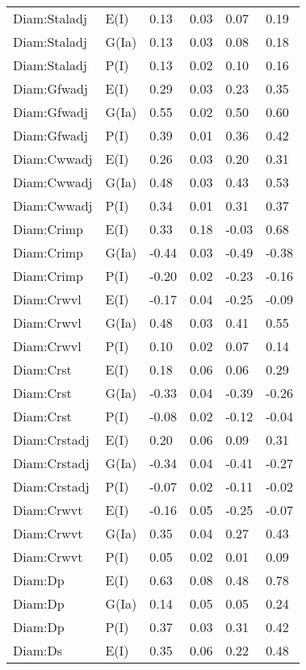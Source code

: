 \begin{center}
\begin{longtable}{|p{1.1in}|p{0.7in}|p{0.7in}|p{0.6in}|p{0.6in}|p{0.6in}|}
  Diam:Staladj & E(I) & 0.13 & 0.03 & 0.07 & 0.19 \\ 
  Diam:Staladj & G(Ia) & 0.13 & 0.03 & 0.08 & 0.18 \\ 
  Diam:Staladj & P(I) & 0.13 & 0.02 & 0.10 & 0.16 \\ 
  Diam:Gfwadj & E(I) & 0.29 & 0.03 & 0.23 & 0.35 \\ 
  Diam:Gfwadj & G(Ia) & 0.55 & 0.02 & 0.50 & 0.60 \\ 
  Diam:Gfwadj & P(I) & 0.39 & 0.01 & 0.36 & 0.42 \\ 
  Diam:Cwwadj & E(I) & 0.26 & 0.03 & 0.20 & 0.31 \\ 
  Diam:Cwwadj & G(Ia) & 0.48 & 0.03 & 0.43 & 0.53 \\ 
  Diam:Cwwadj & P(I) & 0.34 & 0.01 & 0.31 & 0.37 \\ 
  Diam:Crimp & E(I) & 0.33 & 0.18 & -0.03 & 0.68 \\ 
  Diam:Crimp & G(Ia) & -0.44 & 0.03 & -0.49 & -0.38 \\ 
  Diam:Crimp & P(I) & -0.20 & 0.02 & -0.23 & -0.16 \\ 
  Diam:Crwvl & E(I) & -0.17 & 0.04 & -0.25 & -0.09 \\ 
  Diam:Crwvl & G(Ia) & 0.48 & 0.03 & 0.41 & 0.55 \\ 
  Diam:Crwvl & P(I) & 0.10 & 0.02 & 0.07 & 0.14 \\ 
  Diam:Crst & E(I) & 0.18 & 0.06 & 0.06 & 0.29 \\ 
  Diam:Crst & G(Ia) & -0.33 & 0.04 & -0.39 & -0.26 \\ 
  Diam:Crst & P(I) & -0.08 & 0.02 & -0.12 & -0.04 \\ 
  Diam:Crstadj & E(I) & 0.20 & 0.06 & 0.09 & 0.31 \\ 
  Diam:Crstadj & G(Ia) & -0.34 & 0.04 & -0.41 & -0.27 \\ 
  Diam:Crstadj & P(I) & -0.07 & 0.02 & -0.11 & -0.02 \\ 
  Diam:Crwvt & E(I) & -0.16 & 0.05 & -0.25 & -0.07 \\ 
  Diam:Crwvt & G(Ia) & 0.35 & 0.04 & 0.27 & 0.43 \\ 
  Diam:Crwvt & P(I) & 0.05 & 0.02 & 0.01 & 0.09 \\ 
  Diam:Dp & E(I) & 0.63 & 0.08 & 0.48 & 0.78 \\ 
  Diam:Dp & G(Ia) & 0.14 & 0.05 & 0.05 & 0.24 \\ 
  Diam:Dp & P(I) & 0.37 & 0.03 & 0.31 & 0.42 \\ 
  Diam:Ds & E(I) & 0.35 & 0.06 & 0.22 & 0.48 \\ 

\end{longtable}
\end{center}
